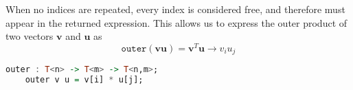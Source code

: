 When no indices are repeated, every index is considered free, and therefore
must appear in the returned expression. This allows us to express the outer
product of two vectors $ \mathbf{v} $ and $ \mathbf{u} $ as 
\[ \texttt{outer} (\mathbf{v} \mathbf{u}) = \mathbf{v}^T \mathbf{u} \rightarrow  v_i u_j\]
\begin{lstlisting}[language=haskell]
    outer : T<n> -> T<m> -> T<n,m>;
    outer v u = v[i] * u[j];
\end{lstlisting}

